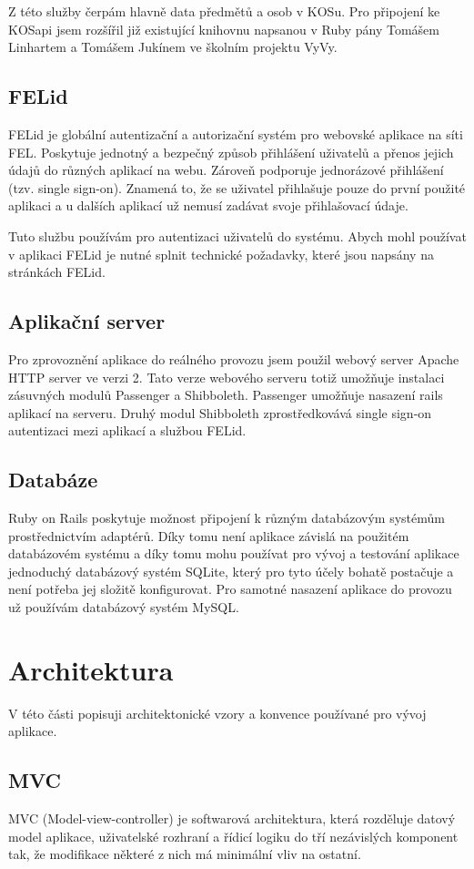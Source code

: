 Z této služby čerpám hlavně data předmětů a osob v KOSu. Pro připojení ke KOSapi jsem rozšířil již existující knihovnu napsanou v Ruby pány Tomášem Linhartem a Tomášem Jukínem ve školním projektu VyVy. 

\subsection{FELid}
FELid je globální autentizační a autorizační systém pro webovské aplikace na síti FEL. Poskytuje jednotný a bezpečný způsob přihlášení uživatelů a přenos jejich údajů do různých aplikací na webu. Zároveň podporuje jednorázové přihlášení (tzv. single sign-on). Znamená to, že se uživatel přihlašuje pouze do první použité aplikaci a u dalších aplikací už nemusí zadávat svoje přihlašovací údaje.

Tuto službu používám pro autentizaci uživatelů do systému. Abych mohl používat v aplikaci FELid je nutné splnit technické požadavky, které jsou napsány na stránkách FELid.

\subsection{Aplikační server}
Pro zprovoznění aplikace do reálného provozu jsem použil webový server Apache HTTP server ve verzi 2. Tato verze webového serveru totiž umožňuje instalaci zásuvných modulů Passenger a Shibboleth. Passenger umožňuje nasazení rails aplikací na serveru. Druhý modul Shibboleth zprostředkovává single sign-on autentizaci mezi aplikací a službou FELid.

\subsection{Databáze}
Ruby on Rails poskytuje možnost připojení k různým databázovým systémům prostřednictvím adaptérů. Díky tomu není aplikace závislá na použitém databázovém systému a díky tomu mohu používat pro vývoj a testování aplikace jednoduchý databázový systém SQLite, který pro tyto účely bohatě postačuje a není potřeba jej složitě konfigurovat. Pro samotné nasazení aplikace do provozu už používám databázový systém MySQL.

\section{Architektura}
V této části popisuji architektonické vzory a konvence používané pro vývoj aplikace. 

\subsection{MVC}
MVC (Model-view-controller) je softwarová architektura, která rozděluje datový model aplikace, uživatelské rozhraní a řídicí logiku do tří nezávislých komponent tak, že modifikace některé z nich má minimální vliv na ostatní. 

